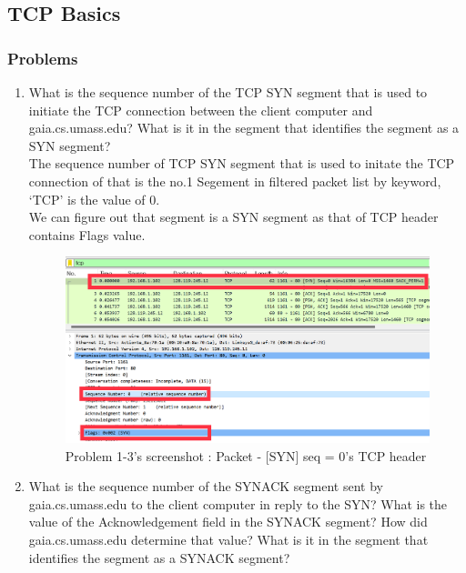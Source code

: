 \subsection{TCP Basics}
    \subsubsection*{Problems}
    \begin{enumerate}[label=\bfseries Problem \arabic*:,leftmargin=*,labelindent=1em]
    \addtocounter{enumi}{2}
        \item What is the sequence number of the TCP SYN segment that is used to initiate the TCP connection between the client computer and gaia.cs.umass.edu? What is it in the segment that identifies the segment as a SYN segment?\\[0.2mm]
        \soln The sequence number of TCP SYN segment that is used to initate the TCP connection of that is the no.1 Segement in filtered packet list by keyword, ‘TCP’ is the value of 0.\\
        We can figure out that segment is a SYN segment as that of TCP header contains Flags value.
        \begin{figure}[!h]\centering
        \hspace{15mm}
    		\includegraphics[width=.85\textwidth]{image/week02/1-3-1.png}
    		\caption{\footnotesize Problem 1-3's screenshot : Packet - [SYN] seq = 0’s TCP header}
    		\vspace{-10pt}
        \end{figure}
        \item What is the sequence number of the SYNACK segment sent by gaia.cs.umass.edu to the client computer in reply to the SYN? What is the value of the Acknowledgement field in the SYNACK segment? How did gaia.cs.umass.edu determine that value? What is it in the segment that identifies the segment as a SYNACK segment?\\[0.2mm]

\end{enumerate}
